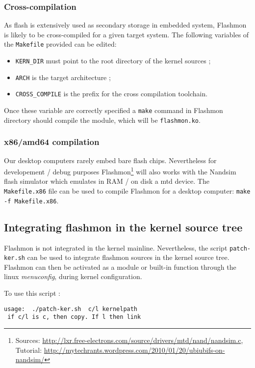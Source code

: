 \documentclass[11pt]{article}
\begin{document}
	\subsubsection{Cross-compilation}
	As flash is extensively used as secondary storage in embedded system, Flashmon is likely to be cross-compiled for a given target system. The following variables of the \verb+Makefile+ provided can be edited:
	
	\begin{itemize}
		\item \verb+KERN_DIR+ must point to the root directory of the kernel sources ;
		\item \verb+ARCH+ is the target architecture ;
		\item \verb+CROSS_COMPILE+ is the prefix for the cross compilation toolchain.
	\end{itemize}
	
	Once these variable are correctly specified a \verb+make+ command in Flashmon directory should compile the module, which will be \verb+flashmon.ko+.
	
	\subsubsection{x86/amd64 compilation}
	Our desktop computers rarely embed bare flash chips. Nevertheless for developement / debug purposes Flashmon\footnote{Sources: \url{http://lxr.free-electrons.com/source/drivers/mtd/nand/nandsim.c},\\Tutorial: \url{http://mytechrants.wordpress.com/2010/01/20/ubiubifs-on-nandsim/}} will also works with the Nandsim flash simulator which emulates in RAM / on disk a mtd device. The \verb+Makefile.x86+ file can be used to compile Flashmon for a desktop computer: \verb+make -f Makefile.x86+.
	
	\subsection{Integrating flashmon in the kernel source tree}
	Flashmon is not integrated in the kernel mainline. Nevertheless, the script \verb+patch-ker.sh+ can be used to integrate flashmon sources in the kernel source tree. Flashmon can then be activated as a module or built-in function through the linux \emph{menuconfig}, during kernel configuration.
	
	To use this script :
\begin{verbatim}
usage:  ./patch-ker.sh  c/l kernelpath
 if c/l is c, then copy. If l then link
\end{verbatim}
	
\end{document}
